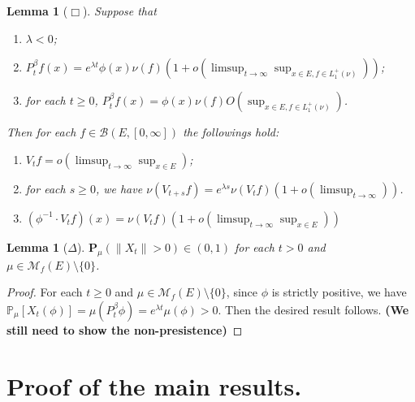 \documentclass[12pt,a4paper]{amsart}
\numberwithin{equation}{section}
\theoremstyle{plain}
\newtheorem{lem}[thm]{Lemma}
\theoremstyle{definition}
\begin{document}
  \begin{lem}[$\Box$]
    \label{lem:PSK}
    Suppose that 
    \begin{enumerate}[label=(\alph*)]
    \item
      \label{lem:PSKa}
      $\lambda < 0$;
    \item
      \label{lem:PSKb}
      $P_t^\beta f(x) 
      = e^{\lambda t} \phi(x) \nu(f) ( 1+ o(\limsup_{t\to \infty} \sup_{x\in E, f\in L_1^+(\nu)}))$;
    \item
      \label{lem:PSKc}
      for each $t\geq 0$, $ P_t^\beta f(x) = \phi(x) \nu(f) O(\sup_{x\in E, f\in L_1^+(\nu)})$.
    \end{enumerate}
    Then for each $f\in \mathcal B(E, [0,\infty])$ the followings hold:
    \begin{enumerate}
    \item 
      \label{lem:PSK1} 
      $V_tf = o(\limsup_{t\to \infty} \sup_{x\in E})$;
    \item 
      \label{lem:PSK2}
      for each $s\geq 0$, we have $\nu(V_{t+s}f) = e^{\lambda s} \nu(V_tf) (1+o(\limsup_{t\to \infty}))$.
    \item 
      \label{lem:PSK3}
      $ (\phi^{-1} \cdot V_tf)(x) = \nu(V_tf) ( 1+ o(\limsup_{t\to \infty} \sup_{x\in E}) )$
    \end{enumerate}
  \end{lem}

  \begin{lem}[$\Delta$]
    \label{lem:PSN}
    $\mathbf P_\mu(\|X_t\| > 0)\in (0, 1)$ for each $t > 0$ and $\mu \in \mathcal M_f(E)\setminus \{0\}$.
  \end{lem}
  
  \begin{proof}
    For each $t\geq 0$ and $\mu \in \mathcal M_f(E)\setminus \{0\}$, since $\phi$ is strictly positive, we have $\mathbb P_\mu[X_t(\phi)] = \mu(P_t^\beta \phi) = e^{\lambda t} \mu(\phi) > 0$. 
    Then the desired result follows.  
    {\bf (We still need to show the non-presistence)}
  \end{proof}

\section{Proof of the main results.}
\end{document}

